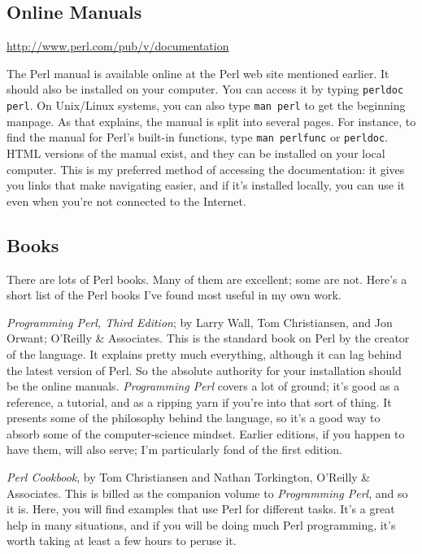 \subsection{Online Manuals}
\href{http://www.perl.com/pub/v/documentation}{http://www.perl.com/pub/v/documentation}

\begin{adjustwidth}{2em}{}
The Perl manual is available online at the Perl web site mentioned earlier. It should also be installed on your computer. You can access it by typing \verb|perldoc perl|. On Unix/Linux systems, you can also type \verb|man perl| to get the beginning manpage. As that explains, the manual is split into several pages. For instance, to find the manual for Perl's built-in functions, type \verb|man perlfunc| or \verb|perldoc|. HTML versions of the manual exist, and they can be installed on your local computer. This is my preferred method of accessing the documentation: it gives you links that make navigating easier, and if it's installed locally, you can use it even when you're not connected to the Internet.
\end{adjustwidth}

\subsection{Books}
There are lots of Perl books. Many of them are excellent; some are not. Here's a short list of the Perl books I've found most useful in my own work.

\textit{Programming Perl, Third Edition}; by Larry Wall, Tom Christiansen, and Jon Orwant; O'Reilly \& Associates. This is the standard book on Perl by the creator of the language. It explains pretty much everything, although it can lag behind the latest version of Perl. So the absolute authority for your installation should be the online manuals. \textit{Programming Perl} covers a lot of ground; it's good as a reference, a tutorial, and as a ripping yarn if you're into that sort of thing. It presents some of the philosophy behind the language, so it's a good way to absorb some of the computer-science mindset. Earlier editions, if you happen to have them, will also serve; I'm particularly fond of the first edition.

\textit{Perl Cookbook}, by Tom Christiansen and Nathan Torkington, O'Reilly \& Associates. This is billed as the companion volume to \textit{Programming Perl}, and so it is. Here, you will find examples that use Perl for different tasks. It's a great help in many situations, and if you will be doing much Perl programming, it's worth taking at least a few hours to peruse it.

